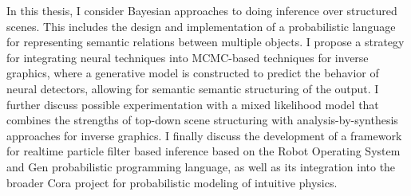 

In this thesis, I consider Bayesian approaches to doing inference over
structured scenes. This includes the design and implementation of a
probabilistic language for representing semantic relations between multiple
objects. I propose a strategy for integrating neural techniques into MCMC-based
techniques for inverse graphics, where a generative model is constructed to
predict the behavior of neural detectors, allowing for semantic semantic
structuring of the output. I further discuss possible experimentation with a
mixed likelihood model that combines the strengths of top-down scene
structuring with analysis-by-synthesis approaches for inverse graphics. I
finally discuss the development of a framework for realtime particle filter
based inference based on the Robot Operating System and Gen probabilistic
programming language, as well as its integration into the broader Cora project
for probabilistic modeling of intuitive physics.
